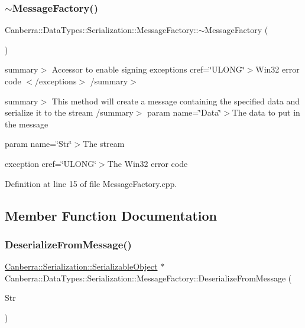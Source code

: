 \subsubsection{\texorpdfstring{$\sim$\+Message\+Factory()}{~MessageFactory()}}
{\footnotesize\ttfamily Canberra\+::\+Data\+Types\+::\+Serialization\+::\+Message\+Factory\+::$\sim$\+Message\+Factory (\begin{DoxyParamCaption}\item[{void}]{ }\end{DoxyParamCaption})\hspace{0.3cm}{\ttfamily [virtual]}}

summary$>$ Accessor to enable signing exceptions cref=\char`\"{}\+U\+L\+O\+N\+G\char`\"{}$>$Win32 error code $<$/exceptions$>$ /summary$>$

summary$>$ This method will create a message containing the specified data and serialize it to the stream /summary$>$ param name=\char`\"{}\+Data\char`\"{}$>$The data to put in the message

param name=\char`\"{}\+Str\char`\"{}$>$The stream

exception cref=\char`\"{}\+U\+L\+O\+N\+G\char`\"{}$>$The Win32 error code

Definition at line 15 of file Message\+Factory.\+cpp.



\subsection{Member Function Documentation}
\mbox{\label{class_canberra_1_1_data_types_1_1_serialization_1_1_message_factory_a58d4f6449fcb585e027ab6aad1b4e799_a58d4f6449fcb585e027ab6aad1b4e799}} 
\subsubsection{\texorpdfstring{Deserialize\+From\+Message()}{DeserializeFromMessage()}}
{\footnotesize\ttfamily \hyperlink{class_canberra_1_1_serialization_1_1_serializable_object}{Canberra\+::\+Serialization\+::\+Serializable\+Object} $\ast$ Canberra\+::\+Data\+Types\+::\+Serialization\+::\+Message\+Factory\+::\+Deserialize\+From\+Message (\begin{DoxyParamCaption}\item[{\hyperlink{class_canberra_1_1_utility_1_1_core_1_1_byte_stream}{Canberra\+::\+Utility\+::\+Core\+::\+Byte\+Stream} \&}]{Str }\end{DoxyParamCaption})}

